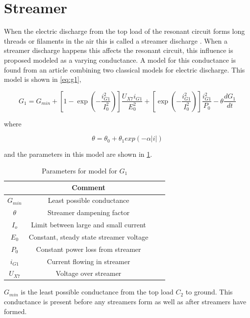 \section{Streamer}
\label{sec:arc}

When the electric discharge from the top load of the resonant circuit forms long threads or filaments in the air this is called a streamer discharge \citep{streamer}. When a streamer discharge happens this affects the resonant circuit, this influence is proposed modeled as a varying conductance. A model for this conductance is found from an article \citep{575670} combining two classical models for electric discharge. This model is shown in \cref{eq:g1},

\begin{equation} \label{eq:g1}
    G_1 = G_{min} + [ 1 - \exp(-\frac{i_{G1}^2}{I_0^2})] \frac{U_{X7} i_{G1}}{E_0^2} + [\exp(-\frac{i_{G1}^2}{I_0^2})] \frac{i_{G1}^2}{P_0} - \theta \frac{d G_1}{dt}
\end{equation}

where

\begin{equation}
    \theta = \theta_0 + \theta_1 exp(-\alpha |i|)
\end{equation}

and the parameters in this model are shown in \cref{tab:g1params}.

\begin{table}[h]
    \centering
    \begin{tabular}{c|c|c|c}
         & Comment &  &\\ \hline
        $G_{min}$ & Least possible conductance &  &\\
        $\theta$  & Streamer dampening factor &  &\\
        $I_o$     & Limit between large and small current &  &\\
        $E_0$     & Constant, steady state streamer voltage &  &\\
        $P_0$     & Constant power loss from streamer &  & \\
        $i_{G1}$  & Current flowing in streamer      &  & \\
        $U_{X7}$     & Voltage over streamer            &  &
    \end{tabular}
    \caption{Parameters for model for $G_1$}
    \label{tab:g1params}
\end{table}

$G_{min}$ is the least possible conductance from the top load $C_2$ to ground. This conductance is present before any streamers form as well as after streamers have formed.

